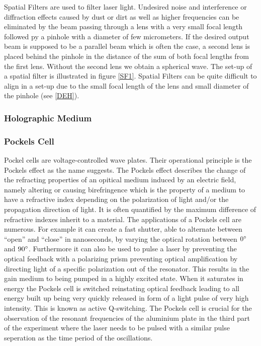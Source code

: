 Spatial Filters are used to filter laser light. Undesired noise and interference or diffraction effects caused by dust or dirt as well as higher frequencies can be eliminated by the beam passing through a lens with a very small focal length followed py a pinhole with a diameter of few micrometers. If the desired output beam is supposed to be a parallel beam which is often the case, a second lens is placed behind the pinhole in the distance of the sum of both focal lengths from the first lens. Without the second lens we obtain a spherical wave. The set-up of a spatial filter is illustrated in figure \ref{SF1}. Spatial Filters can be quite difficult to align in a set-up due to the small focal length of the lens and small diameter of the pinhole (see \ref{DEH}).


\subsubsection{Holographic Medium}

\subsubsection{Pockels Cell}

Pockel cells are voltage-controlled wave plates. Their operational principle is the Pockels effect as the name suggests. The Pockels effect describes the change of the refracting properties of an opitical medium induced by an electric field, namely altering or causing birefringence which is the property of a medium to have a refractive index depending on the polarization of light and/or the propagation direction of light. It is often quantified by the maximum difference of refractive indexes inherit to a material. The applications of a Pockels cell are numerous. For example it can create a fast shutter, able to alternate between ``open'' and ``close'' in nanoseconds, by varying the optical rotation between $0^\circ$ and $90^\circ$. Furthermore it can also be used to pulse a laser by preventing the optical feedback with a polarizing prism preventing optical amplification by directing light of a specific polarization out of the resonator. This results in the gain medium to being pumped in a highly excited state. When it saturates in energy the Pockels cell is switched reinstating optical feedback leading to all energy built up being very quickly released in form of a light pulse of very high intensity. This is known as active Q-switching.
The Pockels cell is crucial for the observation of the resonant frequencies of the aluminium plate in the third part of the experiment where the laser needs to be pulsed with a similar pulse seperation as the time period of the oscillations.




